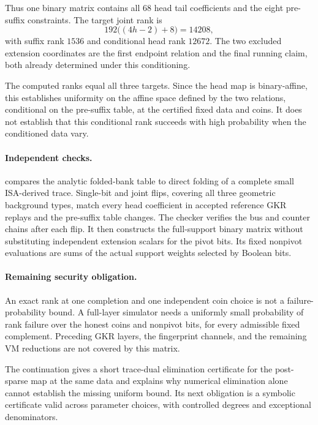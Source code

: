 Thus one binary matrix contains all $68$ head tail coefficients and the eight pre-suffix constraints. The target joint rank is
\[
 192\bigl((4h-2)+8\bigr)=14208,
\]
with suffix rank $1536$ and conditional head rank $12672$. The two excluded extension coordinates are the first endpoint relation and the final running claim, both already determined under this conditioning.

The computed ranks equal all three targets. Since the head map is binary-affine, this establishes uniformity on the affine space defined by the two relations, conditional on the pre-suffix table, at the certified fixed data and coins. It does not establish that this conditional rank succeeds with high probability when the conditioned data vary.

\paragraph{Independent checks.}  compares the analytic folded-bank table to direct folding of a complete small ISA-derived trace. Single-bit and joint flips, covering all three geometric background types, match every head coefficient in accepted reference GKR replays and the pre-suffix table changes. The checker verifies the bus and counter chains after each flip. It then constructs the full-support binary matrix without substituting independent extension scalars for the pivot bits. Its fixed nonpivot evaluations are sums of the actual support weights selected by Boolean bits.

\paragraph{Remaining security obligation.} An exact rank at one completion and one independent coin choice is not a failure-probability bound. A full-layer simulator needs a uniformly small probability of rank failure over the honest coins and nonpivot bits, for every admissible fixed complement. Preceding GKR layers, the fingerprint channels, and the remaining VM reductions are not covered by this matrix.

The continuation  gives a short trace-dual elimination certificate for the post-sparse map at the same data and explains why numerical elimination alone cannot establish the missing uniform bound. Its next obligation is a symbolic certificate valid across parameter choices, with controlled degrees and exceptional denominators.
